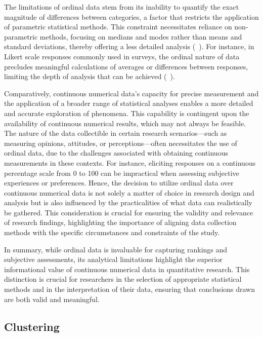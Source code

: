 \documentclass{article}
\begin{document}
The limitations of ordinal data stem from its inability to quantify the exact magnitude of differences between categories, a factor that restricts the application of parametric statistical methods. This constraint necessitates reliance on non-parametric methods, focusing on medians and modes rather than means and standard deviations, thereby offering a less detailed analysis (~\cite{Conover1999}). 
For instance, in Likert scale responses commonly used in surveys, the ordinal nature of data precludes meaningful calculations of averages or differences between responses, limiting the depth of analysis that can be achieved (~\cite{Likert1932}).

Comparatively, continuous numerical data's capacity for precise measurement and the application of a broader range of statistical analyses enables a more detailed and accurate exploration of phenomena. 
This capability is contingent upon the availability of continuous numerical results, which may not always be feasible. The nature of the data collectible in certain research scenarios—such as measuring opinions, attitudes, or perceptions—often necessitates the use of ordinal data, due to the challenges associated with obtaining continuous measurements in these contexts. For instance, eliciting responses on a continuous percentage scale from 0 to 100 can be impractical when assessing subjective experiences or preferences. Hence, the decision to utilize ordinal data over continuous numerical data is not solely a matter of choice in research design and analysis but is also influenced by the practicalities of what data can realistically be gathered. This consideration is crucial for ensuring the validity and relevance of research findings, highlighting the importance of aligning data collection methods with the specific circumstances and constraints of the study.

In summary, while ordinal data is invaluable for capturing rankings and subjective assessments, 
its analytical limitations highlight the superior informational value of continuous numerical data in quantitative research. 
This distinction is crucial for researchers in the selection of appropriate statistical methods and in the interpretation of their data, 
ensuring that conclusions drawn are both valid and meaningful.

\subsection*{Clustering}
\end{document}
